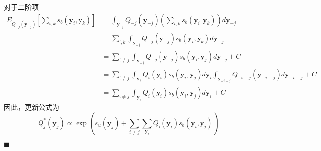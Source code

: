 对于二阶项
\begin{equation}
    \begin{split}
        E_{Q_{-j}(\boldsymbol{y}_{-j})}\left[\sum_{i,k} s_b(\boldsymbol{y}_i,\boldsymbol{y}_k) \right] &=\int_{\boldsymbol{y}_{-j}} Q_{-j}(\boldsymbol{y}_{-j})\left(\sum_{i,k} s_b(\boldsymbol{y}_i,\boldsymbol{y}_k) \right) d\boldsymbol{y}_{-j}\\
        &=\sum_{i,k}\int_{\boldsymbol{y}_{-j}} Q_{-j}(\boldsymbol{y}_{-j})s_b(\boldsymbol{y}_i,\boldsymbol{y}_k) d\boldsymbol{y}_{-j}\\
        &=\sum_{i\neq j}{\int_{\boldsymbol{y}_{-j}}Q_{-j}(\boldsymbol{y}_{-j}) s_b(\boldsymbol{y}_i,\boldsymbol{y}_j)  d\boldsymbol{y}_{-j}} +C\\
        &=\sum_{i\neq j}{\int_{\boldsymbol{y}_i}Q_{i}(\boldsymbol{y}_i) s_b(\boldsymbol{y}_i,\boldsymbol{y}_j)  d\boldsymbol{y}_i}{\int_{\boldsymbol{y}_{-i-j}}Q_{{-i-j}}(\boldsymbol{y}_{-i-j})   d\boldsymbol{y}_{-i-j}} +C\\
        &=\sum_{i\neq j}{\int_{\boldsymbol{y}_i}Q_{i}(\boldsymbol{y}_i) s_b(\boldsymbol{y}_i,\boldsymbol{y}_j)  d\boldsymbol{y}_i} +C
    \end{split}
\end{equation}
因此，更新公式为
\begin{equation}
    {Q^{\ast}_j(\boldsymbol{y}_j)}\propto \exp\left(s_u(\boldsymbol{y}_j) + \sum_{i\neq j}{\sum_{\boldsymbol{y}_i}Q_{i}(\boldsymbol{y}_i) s_b(\boldsymbol{y}_i,\boldsymbol{y}_j)} \right)
\end{equation}

\noindent$\blacksquare$
